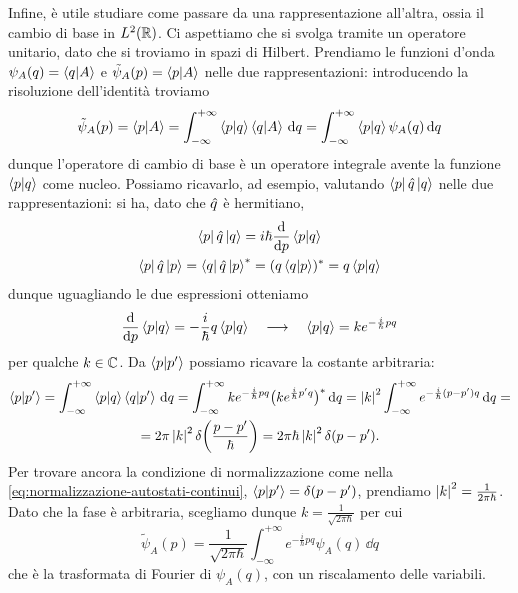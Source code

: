 Infine, è utile studiare come passare da una rappresentazione all'altra, ossia il cambio di base in $L^2(\mathbb{R})$.
Ci aspettiamo che si svolga tramite un operatore unitario, dato che si troviamo in spazi di Hilbert.
Prendiamo le funzioni d'onda $\psi_A(q)=\left\langle{q}\middle|{A}\right\rangle$ e $\tilde{\psi}_A(p)=\left\langle{p}\middle|{A}\right\rangle$ nelle due rappresentazioni: introducendo la risoluzione dell'identità troviamo
\begin{equation}
	\tilde{\psi}_A(p)=\left\langle{p}\middle|{A}\right\rangle=\int_{-\infty}^{+\infty}\left\langle{p}\middle|{q}\right\rangle\left\langle{q}\middle|{A}\right\rangle\,\textup{d} q=\int_{-\infty}^{+\infty}\left\langle{p}\middle|{q}\right\rangle\psi_A(q)\,\textup{d} q
\end{equation}
dunque l'operatore di cambio di base è un operatore integrale avente la funzione $\left\langle{p}\middle|{q}\right\rangle$ come nucleo.
Possiamo ricavarlo, ad esempio, valutando $\left\langle{p}\right|\hat{q}\left|{q}\right\rangle$ nelle due rappresentazioni: si ha, dato che $\hat{q}$ è hermitiano,
\begin{equation}
	\begin{gathered}
		\left\langle{p}\right|\hat{q}\left|{q}\right\rangle=i\hbar\frac{\textup{d} {}}{\textup{d} {p}}\left\langle{p}\middle|{q}\right\rangle\\
		\left\langle{p}\right|\hat{q}\left|{p}\right\rangle=\left\langle{q}\right|\hat{q}\left|{p}\right\rangle^*=(q\left\langle{q}\middle|{p}\right\rangle)^*=q\left\langle{p}\middle|{q}\right\rangle
	\end{gathered}
\end{equation}
dunque uguagliando le due espressioni otteniamo
\begin{equation}
	\frac{\textup{d} {}}{\textup{d} {p}}\left\langle{p}\middle|{q}\right\rangle=-\frac{i}{\hbar}q\left\langle{p}\middle|{q}\right\rangle\quad\longrightarrow\quad\left\langle{p}\middle|{q}\right\rangle=ke^{-\frac{i}{\hbar}pq}
	\label{eq:nucleo-operatore-cambio-base-pq}
\end{equation}
per qualche $k\in\mathbb{C}$.
Da $\left\langle{p}\middle|{p'}\right\rangle$ possiamo ricavare la costante arbitraria:
\begin{multline}
	\left\langle{p}\middle|{p'}\right\rangle=\int_{-\infty}^{+\infty}\left\langle{p}\middle|{q}\right\rangle\left\langle{q}\middle|{p'}\right\rangle\,\textup{d} q=
	\int_{-\infty}^{+\infty}ke^{-\frac{i}{\hbar}pq}\big(ke^{\frac{i}{\hbar}p'q}\big)^*\,\textup{d} q=
	\left|{k}\right|^2\int_{-\infty}^{+\infty}e^{-\frac{i}{\hbar}(p-p')q}\,\textup{d} q=\\=
	2\pi\left|{k}\right|^2\delta\bigg(\frac{p-p'}{\hbar}\bigg)=
	2\pi\hbar\left|{k}\right|^2\delta(p-p').
\end{multline}
Per trovare ancora la condizione di normalizzazione come nella \eqref{eq:normalizzazione-autostati-continui}, $\left\langle{p}\middle|{p'}\right\rangle=\delta(p-p')$, prendiamo $\left|{k}\right|^2=\frac1{2\pi\hbar}$.
Dato che la fase è arbitraria, scegliamo dunque $k=\frac1{\sqrt{2\pi\hbar}}$ per cui
\begin{equation}
	\tilde{\psi}_A(p)=\frac1{\sqrt{2\pi\hbar}}\int_{-\infty}^{+\infty}e^{-\frac{i}{\hbar}pq}\psi_A(q)\,\dd q
	\label{eq:cambiamento-base-posizione-impulso}
\end{equation}
che è la trasformata di Fourier di $\psi_A(q)$, con un riscalamento delle variabili.


